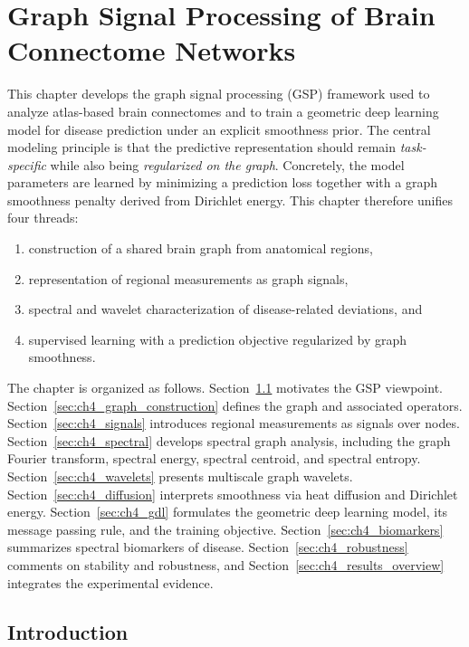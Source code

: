 \chapter{Graph Signal Processing of Brain Connectome Networks}
\label{chap:gsp_connectome} %

This chapter develops the graph signal processing (GSP) framework used to analyze atlas-based brain connectomes and to train a geometric deep learning model for disease prediction under an explicit smoothness prior. The central modeling principle is that the predictive representation should remain \emph{task-specific} while also being \emph{regularized on the graph}. Concretely, the model parameters are learned by minimizing a prediction loss together with a graph smoothness penalty derived from Dirichlet energy. This chapter therefore unifies four threads:
\begin{enumerate}[label=(\roman*)] %
    \item construction of a shared brain graph from anatomical regions,
    \item representation of regional measurements as graph signals,
    \item spectral and wavelet characterization of disease-related deviations, and
    \item supervised learning with a prediction objective regularized by graph smoothness.
\end{enumerate}

The chapter is organized as follows. Section~\ref{sec:ch4_intro} motivates the GSP viewpoint. Section~\ref{sec:ch4_graph_construction} defines the graph and associated operators. Section~\ref{sec:ch4_signals} introduces regional measurements as signals over nodes. Section~\ref{sec:ch4_spectral} develops spectral graph analysis, including the graph Fourier transform, spectral energy, spectral centroid, and spectral entropy. Section~\ref{sec:ch4_wavelets} presents multiscale graph wavelets. Section~\ref{sec:ch4_diffusion} interprets smoothness via heat diffusion and Dirichlet energy. Section~\ref{sec:ch4_gdl} formulates the geometric deep learning model, its message passing rule, and the training objective. Section~\ref{sec:ch4_biomarkers} summarizes spectral biomarkers of disease. Section~\ref{sec:ch4_robustness} comments on stability and robustness, and Section~\ref{sec:ch4_results_overview} integrates the experimental evidence.

\section{Introduction}
\label{sec:ch4_intro} %

